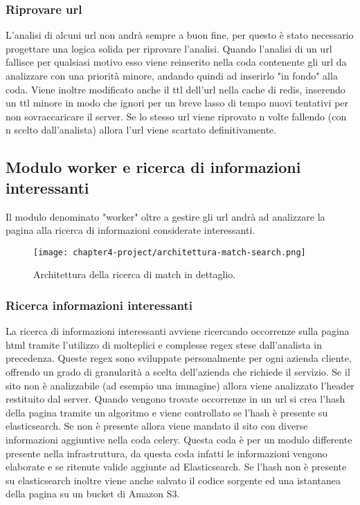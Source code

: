 \subsubsection{Riprovare url}

L'analisi di alcuni url non andrà sempre a buon fine, per questo è stato necessario progettare una logica solida per riprovare l'analisi. Quando l'analisi di un url fallisce per qualsiasi motivo esso viene reinserito nella coda contenente gli url da analizzare con una priorità minore, andando quindi ad inserirlo "in fondo" alla coda. Viene inoltre modificato anche il ttl dell'url nella cache di redis, inserendo un ttl minore in modo che ignori per un breve lasso di tempo nuovi tentativi per non sovraccaricare il server. Se lo stesso url viene riprovato n volte fallendo (con n scelto dall'analista) allora l'url viene scartato definitivamente.


\subsection{Modulo worker e ricerca di informazioni interessanti}


Il modulo denominato "worker" oltre a gestire gli url andrà ad analizzare la pagina alla ricerca di informazioni considerate interessanti.
\begin{figure}[!h] 
    \centering 
    \texttt{[image: chapter4-project/architettura-match-search.png]} 
    \caption{Architettura della ricerca di match in dettaglio.}
\end{figure}

\subsubsection{Ricerca informazioni interessanti}

La ricerca di informazioni interessanti avviene ricercando occorrenze sulla pagina html tramite l'utilizzo di molteplici e complesse regex stese dall'analista in precedenza. Queste regex sono sviluppate personalmente per ogni azienda cliente, offrendo un grado di granularità a scelta dell'azienda che richiede il servizio. Se il sito non è analizzabile (ad esempio una immagine) allora viene analizzato l'header restituito dal server. Quando vengono trovate occorrenze in un url si crea l'hash della pagina tramite un algoritmo e viene controllato se l'hash è presente su elasticsearch. Se non è presente allora viene mandato il sito con diverse informazioni aggiuntive nella coda celery. Questa coda è per un modulo differente presente nella infrastruttura, da questa coda infatti le informazioni vengono elaborate e se ritenute valide aggiunte ad Elasticsearch. \newline{}
Se l'hash non è presente su elasticsearch inoltre viene anche salvato il codice sorgente ed una istantanea della pagina su un bucket di Amazon S3.